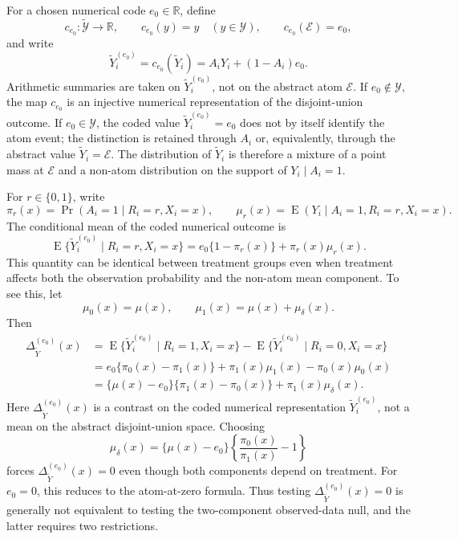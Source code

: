 \documentclass[11pt]{article}
\DeclareMathOperator*{\E}{E}
\begin{document}
For a chosen numerical code $e_0\in\mathbb{R}$, define
\[
  c_{e_0}:\widetilde{\mathcal{Y}}\to\mathbb{R},
  \qquad
  c_{e_0}(y)=y \quad (y\in\mathcal{Y}),
  \qquad
  c_{e_0}(\mathcal{E})=e_0,
\]
and write
\[
  \widetilde{Y}_i^{(e_0)}
  =c_{e_0}(\widetilde{Y}_i)
  =A_iY_i+(1-A_i)e_0.
\]
Arithmetic summaries are taken on $\widetilde{Y}_i^{(e_0)}$, not on the abstract atom $\mathcal{E}$. If $e_0\notin\mathcal{Y}$, the map $c_{e_0}$ is an injective numerical representation of the disjoint-union outcome. If $e_0\in\mathcal{Y}$, the coded value $\widetilde{Y}_i^{(e_0)}=e_0$ does not by itself identify the atom event; the distinction is retained through $A_i$ or, equivalently, through the abstract value $\widetilde{Y}_i=\mathcal{E}$. The distribution of $\widetilde{Y}_i$ is therefore a mixture of a point mass at $\mathcal{E}$ and a non-atom distribution on the support of $Y_i \mid A_i = 1$.

For $r\in\{0,1\}$, write
\[
  \pi_r(x)=\Pr(A_i=1\mid R_i=r,X_i=x),
  \qquad
  \mu_r(x)=\E(Y_i\mid A_i=1,R_i=r,X_i=x).
\]
The conditional mean of the coded numerical outcome is
\[
  \E\{\widetilde{Y}_i^{(e_0)}\mid R_i=r,X_i=x\}
  = e_0\{1-\pi_r(x)\}+\pi_r(x)\mu_r(x).
\]
This quantity can be identical between treatment groups even when treatment affects both the observation probability and the non-atom mean component. To see this, let
\[
  \mu_0(x)=\mu(x),
  \qquad
  \mu_1(x)=\mu(x)+\mu_\delta(x).
\]
Then
\begin{align*}
  \Delta_{\widetilde{Y}}^{(e_0)}(x)
  &= \E\{\widetilde{Y}_i^{(e_0)}\mid R_i=1,X_i=x\}
     -\E\{\widetilde{Y}_i^{(e_0)}\mid R_i=0,X_i=x\}\\
  &= e_0\{\pi_0(x)-\pi_1(x)\}
     +\pi_1(x)\mu_1(x)-\pi_0(x)\mu_0(x)\\
  &= \{\mu(x)-e_0\}\{\pi_1(x)-\pi_0(x)\}
     +\pi_1(x)\mu_\delta(x).
\end{align*}
Here $\Delta_{\widetilde{Y}}^{(e_0)}(x)$ is a contrast on the coded numerical representation $\widetilde{Y}_i^{(e_0)}$, not a mean on the abstract disjoint-union space.
Choosing
\[
  \mu_\delta(x)
  =\{\mu(x)-e_0\}
  \left\{\frac{\pi_0(x)}{\pi_1(x)}-1\right\}
\]
forces $\Delta_{\widetilde{Y}}^{(e_0)}(x)=0$ even though both components depend on treatment. For $e_0=0$, this reduces to the atom-at-zero formula. Thus testing $\Delta_{\widetilde{Y}}^{(e_0)}(x)=0$ is generally not equivalent to testing the two-component observed-data null, and the latter requires two restrictions.
\end{document}
